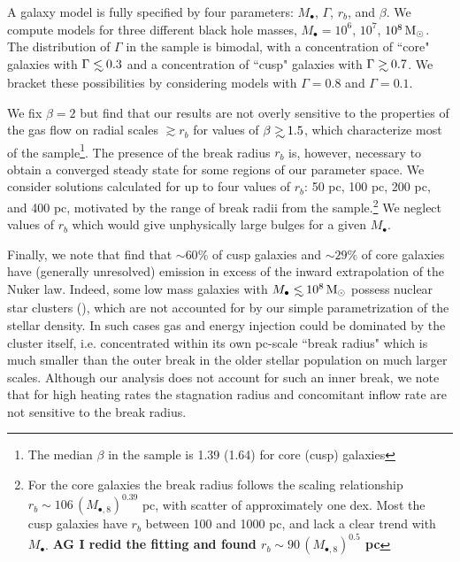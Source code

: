 \documentclass[usenatbib,fleqn]{mn2e}
\newcommand\lsim{\mathrel{\rlap{\lower4pt\hbox{\hskip1pt$\sim$}}
    \raise1pt\hbox{$<$}}}
\newcommand\gsim{\mathrel{\rlap{\lower4pt\hbox{\hskip1pt$\sim$}}
    \raise1pt\hbox{$>$}}}
\newcommand{\rb}{r_b}
\newcommand{\Mbh}[1][]{M_{\bullet#1}}
\newcommand{\Mbheight}{M_{\bullet,8}}
\begin{document}
A galaxy model is fully specified by four parameters: $\Mbh$,
$\Gamma$, $r_b$, and $\beta$.  We compute models for three different
black hole masses, $\Mbh = 10^6$, $10^7$, $10^8 \,{\rm M_\odot}$.  The
distribution of $\Gamma$ in the \citet{LauerFaber+:2007a} sample is
bimodal, with a concentration of ``core" galaxies with $\Gamma \lsim
0.3$ and a concentration of ``cusp" galaxies with $\Gamma \gsim 0.7$.
We bracket these possibilities by considering models with $\Gamma=0.8$
and $\Gamma=0.1$.  

We fix $\beta = 2$ but find that our results are not overly sensitive
to the properties of the gas flow on radial scales $\gtrsim r_b$ for
values of $\beta\gsim 1.5$, which characterize most of the
\citet{LauerFaber+:2007a} sample\footnote{The median $\beta$ in the
  \citet{LauerFaber+:2007a} sample is 1.39 (1.64) for core (cusp)
  galaxies}.  The presence of the break radius $r_{b}$ is, however,
necessary to obtain a converged steady state for some regions of our
parameter space.  We consider solutions calculated for up to four
values of $\rb$: 50 pc, 100 pc, 200 pc, and 400 pc, motivated by the
range of break radii from the \citet{LauerFaber+:2007a}
sample.\footnote{For the core galaxies the break radius follows the
  scaling relationship $\rb\sim 106 \, (\Mbheight)^{0.39}$ pc, with
  scatter of approximately one dex.  Most the cusp galaxies have $\rb$
  between 100 and 1000 pc, and lack a clear trend with $\Mbh$. {\bf AG
    I redid the fitting and found $\rb\sim 90 \, (\Mbheight)^{0.5}$
    pc}} We neglect values of $r_b$ which would give unphysically
large bulges for a given $\Mbh$.



Finally, we note that \citealt{LauerFaber+:2005a} find that $\sim
60\%$ of cusp galaxies and $\sim29\%$ of core galaxies have (generally
unresolved) emission in excess of the inward extrapolation of the
Nuker law.  Indeed, some low mass galaxies with $\Mbh\lsim 10^{8}
\Msun$ possess nuclear star clusters (\citealt{GrahamSpitler:2009a}),
which are not accounted for by our simple parametrization of the
stellar density.  In such cases gas and energy injection could be
dominated by the cluster itself, i.e. concentrated within its own
pc-scale ``break radius" which is much smaller than the outer break in
the older stellar population on much larger scales.  Although our
analysis does not account for such an inner break, we note that for
high heating rates the stagnation radius and concomitant inflow
rate are not sensitive to the break radius.
\end{document}
